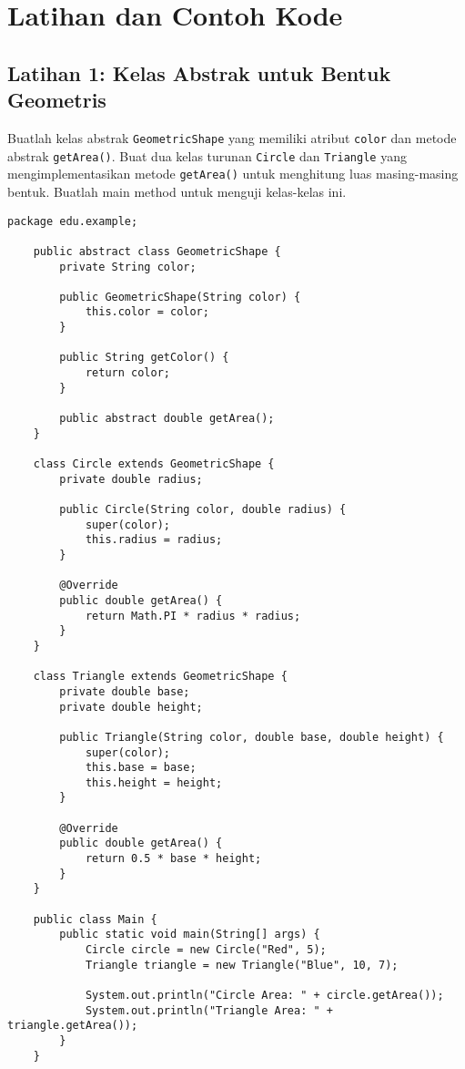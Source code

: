 \section{Latihan dan Contoh Kode}

\subsection{Latihan 1: Kelas Abstrak untuk Bentuk Geometris}

Buatlah kelas abstrak \texttt{GeometricShape} yang memiliki atribut \texttt{color} dan metode abstrak \texttt{getArea()}. Buat dua kelas turunan \texttt{Circle} dan \texttt{Triangle} yang mengimplementasikan metode \texttt{getArea()} untuk menghitung luas masing-masing bentuk. Buatlah main method untuk menguji kelas-kelas ini.

\begin{lstlisting}[style=JavaStyle]
	package edu.example;
	
	public abstract class GeometricShape {
		private String color;
		
		public GeometricShape(String color) {
			this.color = color;
		}
		
		public String getColor() {
			return color;
		}
		
		public abstract double getArea();
	}
	
	class Circle extends GeometricShape {
		private double radius;
		
		public Circle(String color, double radius) {
			super(color);
			this.radius = radius;
		}
		
		@Override
		public double getArea() {
			return Math.PI * radius * radius;
		}
	}
	
	class Triangle extends GeometricShape {
		private double base;
		private double height;
		
		public Triangle(String color, double base, double height) {
			super(color);
			this.base = base;
			this.height = height;
		}
		
		@Override
		public double getArea() {
			return 0.5 * base * height;
		}
	}
	
	public class Main {
		public static void main(String[] args) {
			Circle circle = new Circle("Red", 5);
			Triangle triangle = new Triangle("Blue", 10, 7);
			
			System.out.println("Circle Area: " + circle.getArea());
			System.out.println("Triangle Area: " + triangle.getArea());
		}
	}
\end{lstlisting}

